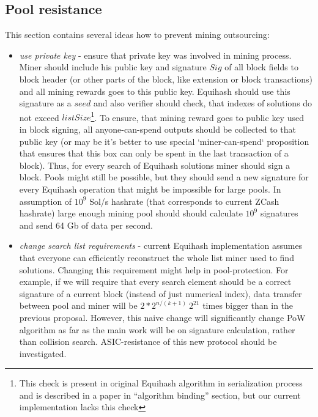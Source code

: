 \subsection{Pool resistance}

This section contains several ideas how to prevent mining outsourcing:

\begin{itemize}
    \item{\em use private key } - ensure that private key was involved in mining process.
    Miner should include his public key and signature $Sig$ of all block fields to block header
    (or other parts of the block, like extension or block transactions)
    and all mining rewards goes to this public key.
    Equihash should use this signature as a $seed$ and also verifier should check, that indexes of solutions do
    not exceed $listSize$\footnote{This check is present in original Equihash algorithm in serialization process
    and is described in a paper in ``algorithm binding'' section, but our
current implementation lacks this check}.
    To ensure, that mining reward goes to public key used in block signing, all anyone-can-spend outputs should
    be collected to that public key (or may be it's better to use special `miner-can-spend` proposition
    that ensures that this box can only be spent in the last transaction of a block).
    Thus, for every search of Equihash solutions miner should sign a block.
    Pools might still be possible, but they should send a new signature for every Equihash operation that might
    be impossible for large pools. In assumption of $10^9$ Sol/s hashrate (that corresponds to current ZCash
    hashrate) large enough mining pool should should calculate $10^9$ signatures and send 64 Gb of data per second.

    \item{\em change search list requirements} - current Equihash implementation assumes that everyone can efficiently
    reconstruct the whole list miner used to find solutions. Changing this requirement might help in pool-protection.
    For example, if we will require that every search element should be a correct signature of a current block
    (instead of just numerical index), data transfer between pool and miner will be $2*2^{n / (k + 1)}~2^21$ times
    bigger than in the previous proposal.
    However, this naive change will significantly change PoW algorithm as far as the main work will be
    on signature calculation, rather than collision search.
    ASIC-resistance of this new protocol should be investigated.


\end{itemize}
